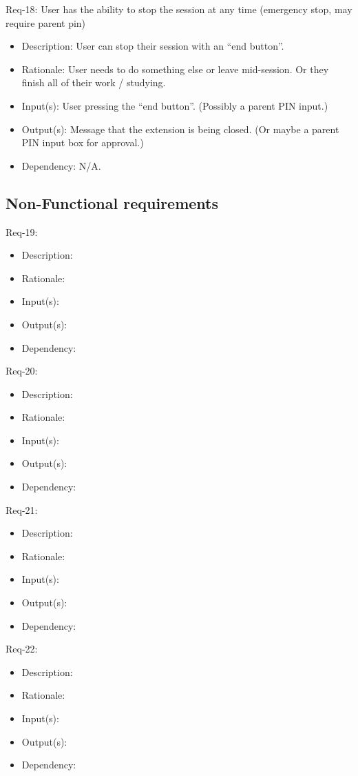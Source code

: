 \documentclass[12pt]{article}
\begin{document}
Req-18: User has the ability to stop the session at any time (emergency stop, may require parent pin) 
\begin{itemize}
    \item Description: User can stop their session with an “end button”.
    \item Rationale: User needs to do something else or leave mid-session. Or they finish all of their work / studying.
    \item Input(s): User pressing the “end button”. (Possibly a parent PIN input.)
    \item Output(s): Message that the extension is being closed. (Or maybe a parent PIN input box for approval.)
    \item Dependency: N/A.
\end{itemize}
\subsection{Non-Functional requirements}
Req-19: 
\begin{itemize}
    \item Description: 
    \item Rationale: 
    \item Input(s): 
    \item Output(s): 
    \item Dependency: 
\end{itemize}
Req-20: 
\begin{itemize}
    \item Description: 
    \item Rationale: 
    \item Input(s): 
    \item Output(s): 
    \item Dependency: 
\end{itemize}
Req-21: 
\begin{itemize}
    \item Description: 
    \item Rationale: 
    \item Input(s): 
    \item Output(s): 
    \item Dependency: 
\end{itemize}
Req-22:  
\begin{itemize}
    \item Description: 
    \item Rationale: 
    \item Input(s): 
    \item Output(s): 
    \item Dependency: 
\end{itemize}
\end{document}
